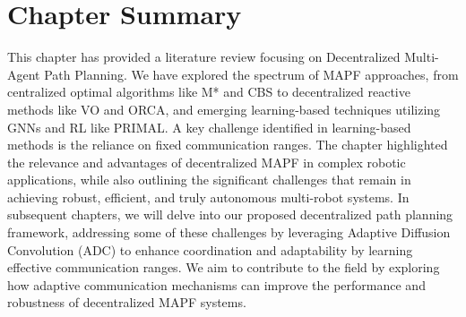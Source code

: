 \section{Chapter Summary}
This chapter has provided a literature review focusing on Decentralized Multi-Agent Path Planning. We have explored the spectrum of MAPF approaches, from centralized optimal algorithms like M* and CBS to decentralized reactive methods like VO and ORCA, and emerging learning-based techniques utilizing GNNs and RL like PRIMAL. A key challenge identified in learning-based methods is the reliance on fixed communication ranges. The chapter highlighted the relevance and advantages of decentralized MAPF in complex robotic applications, while also outlining the significant challenges that remain in achieving robust, efficient, and truly autonomous multi-robot systems. In subsequent chapters, we will delve into our proposed decentralized path planning framework, addressing some of these challenges by leveraging Adaptive Diffusion Convolution (ADC) to enhance coordination and adaptability by learning effective communication ranges. We aim to contribute to the field by exploring how adaptive communication mechanisms can improve the performance and robustness of decentralized MAPF systems.